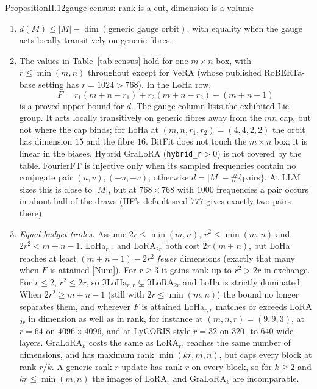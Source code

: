 \begin{restate}{Proposition}{II.12}{gauge census: rank is a cut, dimension is a volume}
\begin{enumerate}[label=(\alph*)]
  \item $d(M)\le\lvert M\rvert-\dim(\text{generic gauge orbit})$, with equality when the gauge acts locally
    transitively on generic fibres.
  \item The values in Table~\ref{tab:census} hold for one $m\times n$ box, with $r\le\min(m,n)$ throughout except for
    VeRA (whose published RoBERTa-base setting has $r=1024>768$). In the LoHa row,
    \begin{equation*}
      F=r_1(m+n-r_1)+r_2(m+n-r_2)-(m+n-1)
    \end{equation*}
    is a proved upper bound for $d$. The gauge column lists the exhibited Lie group. It acts locally transitively on
    generic fibres away from the $mn$ cap, but not where the cap binds; for LoHa at $(m,n,r_1,r_2)=(4,4,2,2)$ the orbit
    has dimension $15$ and the fibre $16$. BitFit does not touch the $m\times n$ box; it is linear in the biases. Hybrid
    GraLoRA (\texttt{hybrid\_r}${}>0$) is not covered by the table. FourierFT is injective only when its sampled
    frequencies contain no conjugate pair $(u,v),(-u,-v)$; otherwise $d=\lvert M\rvert-\#\{\text{pairs}\}$. At LLM sizes
    this is close to $\lvert M\rvert$, but at $768\times768$ with $1000$ frequencies a pair occurs in about half of the
    draws (HF's default seed $777$ gives exactly two pairs there).
  \item \emph{Equal-budget trades.} Assume $2r\le\min(m,n)$, $r^2\le\min(m,n)$ and $2r^2<m+n-1$. LoHa$_{r,r}$ and
    LoRA$_{2r}$ both cost $2r(m+n)$, but LoHa reaches at least $(m+n-1)-2r^2$ \emph{fewer} dimensions (exactly that
    many when $F$ is attained [Num]). For $r\ge3$ it gains rank up to $r^2>2r$ in exchange. For $r\le2$, $r^2\le2r$, so
    $\Im\mathrm{LoHa}_{r,r}\subsetneq\Im\mathrm{LoRA}_{2r}$ and LoHa is strictly dominated. When $2r^2\ge m+n-1$ (still with $2r\le\min(m,n)$) the
    bound no longer separates them, and wherever $F$ is attained LoHa$_{r,r}$ matches or exceeds LoRA$_{2r}$ in
    dimension as well as in rank, for instance at $(m,n,r)=(9,9,3)$, at $r=64$ on $4096\times4096$, and at
    LyCORIS-style $r=32$ on $320$- to $640$-wide layers. GraLoRA$_k$ costs the same as LoRA$_r$, reaches the same
    number of dimensions, and has maximum rank $\min(kr,m,n)$, but caps every block at rank $r/k$. A generic rank-$r$
    update has rank $r$ on every block, so for $k\ge2$ and $kr\le\min(m,n)$ the images of LoRA$_r$ and GraLoRA$_k$ are
    incomparable.
\end{enumerate}
\end{restate}

